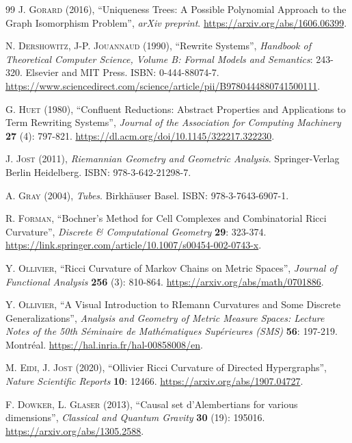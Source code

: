 \documentclass{article}
\begin{document}
\begin{thebibliography}{99}
\textsc{J. Gorard} (2016), ``Uniqueness Trees: A Possible Polynomial Approach to the Graph Isomorphism Problem'', \textit{arXiv preprint}. \url{https://arxiv.org/abs/1606.06399}.

\textsc{N. Dershowitz, J-P. Jouannaud} (1990), ``Rewrite Systems'', \textit{Handbook of Theoretical Computer Science, Volume B: Formal Models and Semantics}: 243-320. Elsevier and MIT Press. ISBN: 0-444-88074-7. \url{https://www.sciencedirect.com/science/article/pii/B9780444880741500111}.

\textsc{G. Huet} (1980), ``Confluent Reductions: Abstract Properties and Applications to Term Rewriting Systems'', \textit{Journal of the Association for Computing Machinery} \textbf{27} (4): 797-821. \url{https://dl.acm.org/doi/10.1145/322217.322230}.

\textsc{J. Jost} (2011), \textit{Riemannian Geometry and Geometric Analysis}. Springer-Verlag Berlin Heidelberg. ISBN: 978-3-642-21298-7.

\textsc{A. Gray} (2004), \textit{Tubes}. Birkh\"auser Basel. ISBN: 978-3-7643-6907-1.

\textsc{R. Forman}, ``Bochner's Method for Cell Complexes and Combinatorial Ricci Curvature'', \textit{Discrete \& Computational Geometry} \textbf{29}: 323-374. \url{https://link.springer.com/article/10.1007/s00454-002-0743-x}.

\textsc{Y. Ollivier}, ``Ricci Curvature of Markov Chains on Metric Spaces'', \textit{Journal of Functional Analysis} \textbf{256} (3): 810-864. \url{https://arxiv.org/abs/math/0701886}.

\textsc{Y. Ollivier}, ``A Visual Introduction to RIemann Curvatures and Some Discrete Generalizations'', \textit{Analysis and Geometry of Metric Measure Spaces: Lecture Notes of the 50th S\'eminaire de Math\'ematiques Sup\'erieures (SMS)} \textbf{56}: 197-219. Montr\'eal. \url{https://hal.inria.fr/hal-00858008/en}.

\textsc{M. Eidi, J. Jost} (2020), ``Ollivier Ricci Curvature of Directed Hypergraphs'', \textit{Nature Scientific Reports} \textbf{10}: 12466. \url{https://arxiv.org/abs/1907.04727}.

\textsc{F. Dowker, L. Glaser} (2013), ``Causal set d'Alembertians for various dimensions'', \textit{Classical and Quantum Gravity} \textbf{30} (19): 195016. \url{https://arxiv.org/abs/1305.2588}.


\end{thebibliography}
\end{document}
